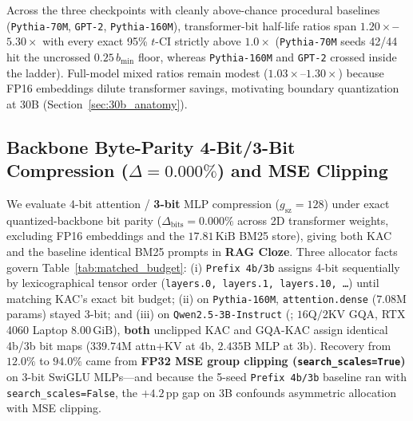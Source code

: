\documentclass[10pt]{article} %
\newcommand{\kac}{\textsc{KAC}}
\newcommand{\gqakac}{\textsc{GQA-KAC}}
\begin{document}
Across the three checkpoints with cleanly above-chance procedural baselines (\texttt{Pythia-70M}, \texttt{GPT-2}, \texttt{Pythia-160M}), transformer-bit half-life ratios span \textbf{$1.20\times$--$5.30\times$} with every exact 95\% $t$-CI strictly above $1.0\times$ (\texttt{Pythia-70M} seeds 42/44 hit the uncrossed $0.25\,b_{\min}$ floor, whereas \texttt{Pythia-160M} and \texttt{GPT-2} crossed inside the ladder). Full-model mixed ratios remain modest ($1.03\times$--$1.30\times$) because FP16 embeddings dilute transformer savings, motivating boundary quantization at 30B (Section~\ref{sec:30b_anatomy}).

\subsection{Backbone Byte-Parity 4-Bit/3-Bit Compression (\texorpdfstring{$\Delta = 0.000\%$}{Delta = 0.000\%}) and MSE Clipping}
\label{sec:matched_budget}

We evaluate 4-bit attention / \textbf{3-bit} MLP compression ($g_{\text{sz}}=128$) under exact quantized-backbone bit parity ($\Delta_{\text{bits}} = 0.000\%$ across 2D transformer weights, excluding FP16 embeddings and the $17.81\,\text{KiB}$ BM25 store), giving both \kac{} and the baseline identical BM25 prompts in \textbf{RAG Cloze}. Three allocator facts govern Table~\ref{tab:matched_budget}: (i) \texttt{Prefix 4b/3b} assigns 4-bit sequentially by lexicographical tensor order (\texttt{layers.0, layers.1, layers.10, \dots}) until matching \kac{}'s exact bit budget; (ii) on \texttt{Pythia-160M}, \texttt{attention.dense} ($7.08\text{M}$ params) stayed 3-bit; and (iii) on \texttt{Qwen2.5-3B-Instruct} (\citealp{qwen2024qwen25}; $16\text{Q}/2\text{KV}$ GQA, RTX 4060 Laptop $8.00\,\text{GiB}$), \textbf{both} unclipped \kac{} and \gqakac{} assign identical 4b/3b bit maps ($339.74\text{M}$ attn+KV at 4b, $2.435\text{B}$ MLP at 3b). Recovery from $12.0\%$ to $94.0\%$ came from \textbf{FP32 MSE group clipping (\texttt{search\_scales=True})} on 3-bit SwiGLU MLPs---and because the 5-seed \texttt{Prefix 4b/3b} baseline ran with \texttt{search\_scales=False}, the $+4.2\,\text{pp}$ gap on 3B confounds asymmetric allocation with MSE clipping.
\end{document}
